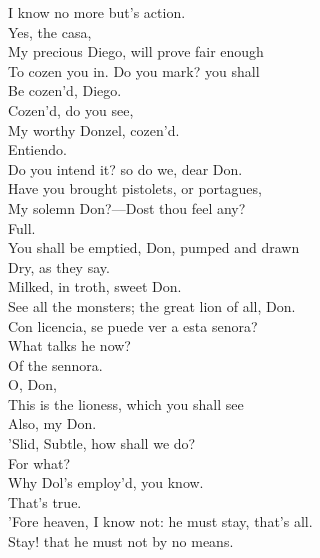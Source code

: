 \documentclass[a4paper,oneside]{memoir}
\begin{document}
\begin{drama*}
I know no more but's action.\\
\subtlespeaks {} Yes, the casa,\\
My precious Diego, will prove fair enough\\
To cozen you in. Do you mark? you shall\\
Be cozen'd, Diego.\\
\facespeaks {} Cozen'd, do you see,\\
My worthy Donzel, cozen'd.\\
\surlyspeaks {} Entiendo.\\
\subtlespeaks Do you intend it? so do we, dear Don.\\
Have you brought pistolets, or portagues,\\
My solemn Don?---Dost thou feel any?\\
\facespeaks {} Full.\\
\subtlespeaks {} You shall be emptied, Don, pumped and drawn\\
Dry, as they say.\\
\facespeaks {} Milked, in troth, sweet Don.\\
\subtlespeaks {} See all the monsters; the great lion of all, Don.\\
\surlyspeaks Con licencia, se puede ver a esta senora?\\
\subtlespeaks What talks he now?\\
\facespeaks {} Of the sennora.\\
\subtlespeaks {} O, Don,\\
This is the lioness, which you shall see\\
Also, my Don.\\
\facespeaks {} 'Slid, Subtle, how shall we do?\\
\subtlespeaks For what?\\
\facespeaks {} Why Dol's employ'd, you know.\\
\subtlespeaks {} That's true.\\
'Fore heaven, I know not: he must stay, that's all.\\
\facespeaks Stay! that he must not by no means.\\

\end{drama*}
\end{document}
